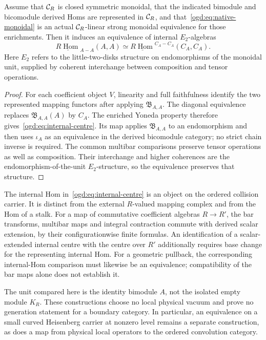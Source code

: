 \begin{corollary}\label{ogd:cor:internal-centre}
Assume that \(\mathcal C_R\) is closed symmetric monoidal, that the indicated bimodule and bicomodule derived Homs are represented in \(\mathcal C_R\), and that~\eqref{ogd:eq:native-monoidal} is an actual \(\mathcal C_R\)-linear strong monoidal equivalence for those enrichments.
Then it induces an equivalence of internal \(E_2\)-algebras
\begin{equation}\label{ogd:eq:internal-centre}
 \underline{R\operatorname{Hom}}_{A-A}(A,A)
 \simeq
 \underline{R\operatorname{Hom}}^{C_A-C_A}(C_A,C_A).
\end{equation}
Here \(E_2\) refers to the little-two-disks structure on endomorphisms of the monoidal unit, supplied by coherent interchange between composition and tensor operations.
\end{corollary}
\begin{proof}
For each coefficient object \(V\), linearity and full faithfulness identify the two represented mapping functors after applying \(\mathfrak B_{A,A}\).
The diagonal equivalence replaces \(\mathfrak B_{A,A}(A)\) by \(C_A\).
The enriched Yoneda property therefore gives~\eqref{ogd:eq:internal-centre}.
Its map applies \(\mathfrak B_{A,A}\) to an endomorphism and then uses \(\iota_A\) as an equivalence in the derived bicomodule category; no strict chain inverse is required.
The common multibar comparisons preserve tensor operations as well as composition.
Their interchange and higher coherences are the endomorphism-of-the-unit \(E_2\)-structure, so the equivalence preserves that structure.
\end{proof}

The internal Hom in~\eqref{ogd:eq:internal-centre} is an object on the ordered collision carrier.
It is distinct from the external \(R\)-valued mapping complex and from the Hom of a stalk.
For a map of commutative coefficient algebras \(R\to R'\), the bar transforms, multibar maps and integral contraction commute with derived scalar extension, by their configurationwise finite formulas.
An identification of a scalar-extended internal centre with the centre over \(R'\) additionally requires base change for the representing internal Hom.
For a geometric pullback, the corresponding internal-Hom comparison must likewise be an equivalence; compatibility of the bar maps alone does not establish it.

The unit compared here is the identity bimodule \(A\), not the isolated empty module \(K_R\).
These constructions choose no local physical vacuum and prove no generation statement for a boundary category.
In particular, an equivalence on a small curved Heisenberg carrier at nonzero level remains a separate construction, as does a map from physical local operators to the ordered convolution category.


